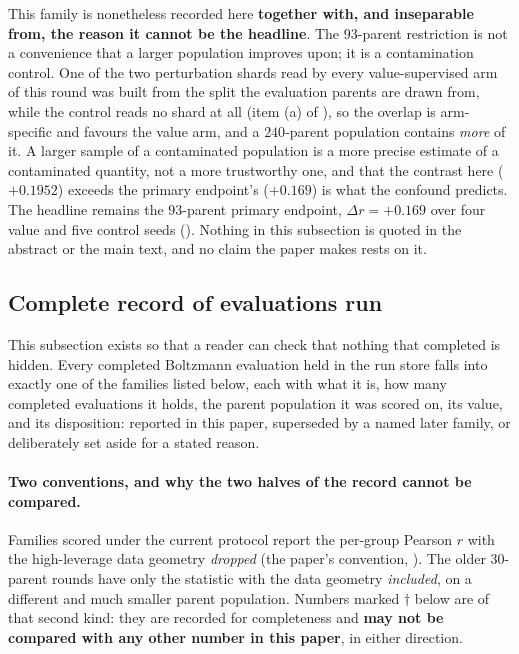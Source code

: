 This family is nonetheless recorded here \textbf{together with, and inseparable from,
the reason it cannot be the headline}. The $93$-parent restriction is not a convenience
that a larger population improves upon; it is a contamination control. One of the two
perturbation shards read by every value-supervised arm of this round was built from the
split the evaluation parents are drawn from, while the control reads no shard at all
(item (a) of ), so the overlap is arm-specific and favours the value arm,
and a $240$-parent population contains \emph{more} of it. A larger sample of a
contaminated population is a more precise estimate of a contaminated quantity, not a
more trustworthy one, and that the contrast here ($+0.1952$) exceeds the primary
endpoint's ($+0.169$) is what the confound predicts. The headline remains the
$93$-parent primary endpoint, $\Delta r = +0.169$ over four value and five control
seeds ().
Nothing in this subsection is quoted in the abstract or the main text, and no claim the
paper makes rests on it.

\subsection{Complete record of evaluations run}
\label{app:allevals}

This subsection exists so that a reader can check that nothing that completed is hidden. Every
completed Boltzmann evaluation held in the run store falls into exactly one of the families
listed below, each with what it is, how many completed evaluations it holds, the parent
population it was scored on, its value, and its disposition: reported in this paper, superseded
by a named later family, or deliberately set aside for a stated reason.

\providecommand{\evfam}[1]{{\scriptsize\ttfamily #1}}

\paragraph{Two conventions, and why the two halves of the record cannot be compared.} Families
scored under the current protocol report the per-group Pearson $r$ with the high-leverage data
geometry \emph{dropped} (the paper's convention, ). The older $30$-parent rounds
have only the statistic with the data geometry \emph{included}, on a different and much smaller
parent population. Numbers marked $\dagger$ below are of that second kind: they are recorded
for completeness and \textbf{may not be compared with any other number in this paper}, in
either direction.

